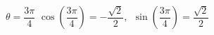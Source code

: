 {$\theta = \dfrac{3\pi}{4}$}
{ $\cos \left(\dfrac{3\pi}{4} \right) = -\dfrac{\sqrt{2}}{2}$, $\; \sin \left(\dfrac{3\pi}{4} \right) = \dfrac{\sqrt{2}}{2}$}
